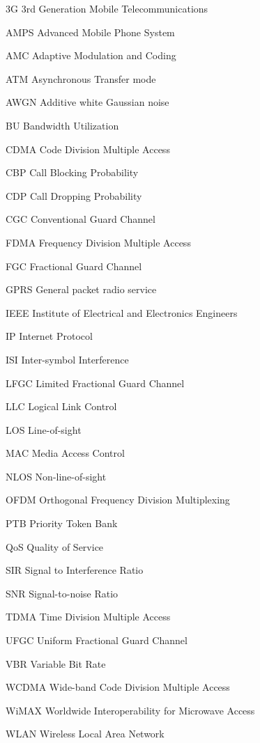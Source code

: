 \begin{denotation}
\item[3G] 3rd Generation Mobile Telecommunications
\item[AMPS] Advanced Mobile Phone System
\item[AMC] Adaptive Modulation and Coding
\item[ATM]Asynchronous Transfer mode
\item[AWGN]  Additive white Gaussian noise
\item[BU] Bandwidth Utilization
\item[CDMA] Code Division Multiple Access 
\item[CBP] Call Blocking Probability
\item[CDP] Call Dropping Probability
\item[CGC] Conventional Guard Channel
\item[FDMA]Frequency Division Multiple Access
\item[FGC] Fractional Guard Channel
  \item[GPRS] General packet radio service
  \item[IEEE] Institute of Electrical and Electronics Engineers
  \item[IP] Internet Protocol
  \item[ISI] Inter-symbol Interference
  \item[LFGC] Limited Fractional Guard Channel
  \item[LLC] Logical Link Control
  \item[LOS] Line-of-sight
  \item[MAC] Media Access Control
  \item[NLOS] Non-line-of-sight
  \item[OFDM] Orthogonal Frequency Division Multiplexing 
  \item[PTB] Priority Token Bank
  \item[QoS] Quality of Service
  \item[SIR] Signal to Interference Ratio
  \item[SNR] Signal-to-noise Ratio
  \item[TDMA]Time Division Multiple Access
  \item[UFGC] Uniform Fractional Guard Channel
  \item[VBR] Variable Bit Rate
  \item[WCDMA] Wide-band Code Division Multiple Access
  \item[WiMAX] Worldwide Interoperability for Microwave Access
  \item[WLAN] Wireless Local Area Network

\end{denotation}
